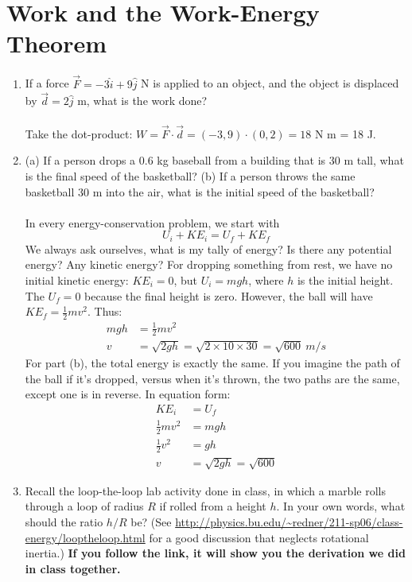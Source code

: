 \documentclass[10pt]{article}
\begin{document}
\section{Work and the Work-Energy Theorem}
\begin{enumerate}
\item If a force $\vec{F} = -3 \hat{i} + 9\hat{j}$ N is applied to an object, and the object is displaced by $\vec{d} = 2\hat{j}$ m, what is the work done? \\ \\
Take the dot-product: $W = \vec{F} \cdot \vec{d} = (-3,9) \cdot (0,2) = 18$ N m = 18 J.
\item (a) If a person drops a 0.6 kg baseball from a building that is 30 m tall, what is the final speed of the basketball? (b) If a person throws the same basketball 30 m into the air, what is the initial speed of the basketball? \\ \\
In every energy-conservation problem, we start with
\begin{equation}
U_i + KE_i = U_f + KE_f
\end{equation}
We always ask ourselves, what is my tally of energy?  Is there any potential energy? Any kinetic energy?  For dropping something from rest, we have no initial kinetic energy: $KE_i = 0$, but $U_i = mgh$, where $h$ is the initial height.  The $U_f =0$ because the final height is zero.  However, the ball will have $KE_f = \frac{1}{2} mv^2$.  Thus:
\begin{align}
mgh &= \frac{1}{2}mv^2 \\
v &= \sqrt{2gh} = \sqrt{2\times 10 \times 30} = \sqrt{600} ~ m/s
\end{align}
For part (b), the total energy is exactly the same.  If you imagine the path of the ball if it's dropped, versus when it's thrown, the two paths are the same, except one is in reverse.  In equation form:
\begin{align}
KE_i &= U_f \\
\frac{1}{2} m v^2 &= mgh \\
\frac{1}{2} v^2 &= g h \\
v &= \sqrt{2gh} = \sqrt{600}
\end{align}
\item Recall the loop-the-loop lab activity done in class, in which a marble rolls through a loop of radius $R$ if rolled from a height $h$.  In your own words, what should the ratio $h/R$ be?  (See \url{http://physics.bu.edu/~redner/211-sp06/class-energy/looptheloop.html} for a good discussion that neglects rotational inertia.)  \textbf{If you follow the link, it will show you the derivation we did in class together.}
\end{enumerate}
\end{document}

